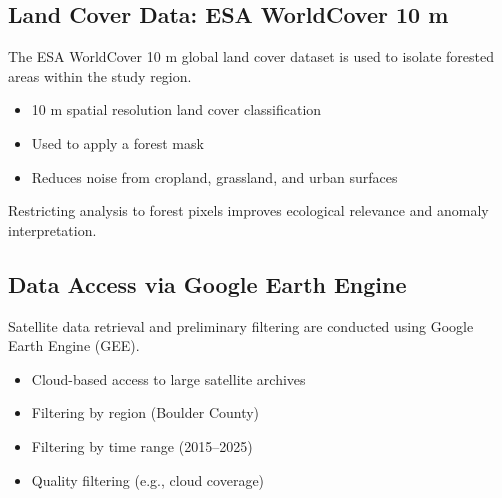 \subsection{Land Cover Data: ESA WorldCover 10 m}

The ESA WorldCover 10 m global land cover dataset is used to isolate forested areas within the study region.

\begin{itemize}
    \item 10 m spatial resolution land cover classification
    \item Used to apply a forest mask
    \item Reduces noise from cropland, grassland, and urban surfaces
\end{itemize}

Restricting analysis to forest pixels improves ecological relevance and anomaly interpretation.

\subsection{Data Access via Google Earth Engine}

Satellite data retrieval and preliminary filtering are conducted using Google Earth Engine (GEE).

\begin{itemize}
    \item Cloud-based access to large satellite archives
    \item Filtering by region (Boulder County)
    \item Filtering by time range (2015--2025)
    \item Quality filtering (e.g., cloud coverage)
\end{itemize}